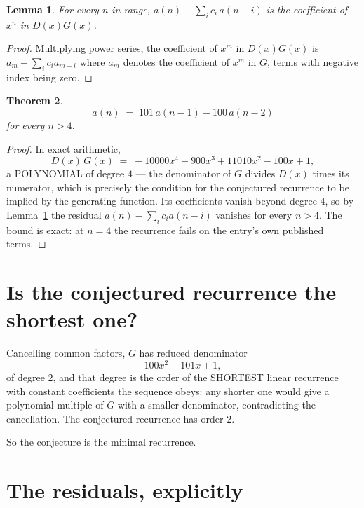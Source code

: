 \documentclass[11pt,a4paper]{article}
\theoremstyle{plain}
\newtheorem{theorem}{Theorem}
\newtheorem{lemma}[theorem]{Lemma}
\theoremstyle{definition}
\begin{document}
\begin{lemma}\label{lem:key}
For every $n$ in range, $a(n)-\sum_i c_i\,a(n-i)$ is the coefficient of $x^{n}$ in
$D(x)G(x)$.
\end{lemma}

\begin{proof}
Multiplying power series, the coefficient of $x^{m}$ in $D(x)G(x)$ is
$a_m-\sum_i c_i a_{m-i}$ where $a_m$ denotes the coefficient of $x^{m}$ in $G$, terms with
negative index being zero.
\end{proof}

\begin{theorem}
\[
a(n)\;=\;101\,a(n-1) - 100\,a(n-2)
\]
for every $n>4$.
\end{theorem}

\begin{proof}
In exact arithmetic,
\[
D(x)\,G(x)\;=\;- 10000 x^{4} - 900 x^{3} + 11010 x^{2} - 100 x + 1,
\]
a POLYNOMIAL of degree $4$ --- the denominator of $G$ divides $D(x)$ times its numerator,
which is precisely the condition for the conjectured recurrence to be implied by the
generating function. Its coefficients vanish beyond degree $4$, so by
Lemma~\ref{lem:key} the residual $a(n)-\sum_ic_ia(n-i)$ vanishes for every
$n>4$. The bound is exact: at $n=4$ the recurrence fails on the entry's own published terms.
\end{proof}

\section{Is the conjectured recurrence the shortest one?}

Cancelling common factors, $G$ has reduced denominator
\[
100 x^{2} - 101 x + 1,
\]
of degree $2$, and that degree is the order of the SHORTEST linear recurrence with
constant coefficients the sequence obeys: any shorter one would give a polynomial multiple of
$G$ with a smaller denominator, contradicting the cancellation. The conjectured recurrence has
order $2$.

So the conjecture is the minimal recurrence.

\section{The residuals, explicitly}
\end{document}
